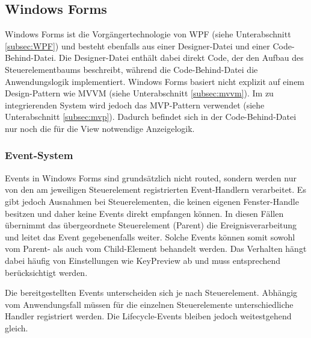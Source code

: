 \subsection{Windows Forms}
\label{subsec:Winforms}
Windows Forms \cite{microsoft_winforms_overview} ist die Vorgängertechnologie von WPF (siehe Unterabschnitt \ref{subsec:WPF}) und besteht ebenfalls aus einer Designer-Datei und einer Code-Behind-Datei. Die Designer-Datei enthält dabei direkt Code, der den Aufbau des Steuerelementbaums beschreibt, während die Code-Behind-Datei die Anwendungslogik implementiert. Windows Forms basiert nicht explizit auf einem Design-Pattern wie MVVM (siehe Unterabschnitt \ref{subsec:mvvm}). Im zu integrierenden System wird jedoch das MVP-Pattern verwendet (siehe Unterabschnitt \ref{subsec:mvp}). Dadurch befindet sich in der Code-Behind-Datei nur noch die für die View notwendige Anzeigelogik.

\subsubsection{Event-System}
Events in Windows Forms \cite{microsoft_winforms_events_overview} sind grundsätzlich nicht routed, sondern werden nur von den am jeweiligen Steuerelement registrierten Event-Handlern verarbeitet. Es gibt jedoch Ausnahmen bei Steuerelementen, die keinen eigenen Fenster-Handle besitzen und daher keine Events direkt empfangen können. In diesen Fällen übernimmt das übergeordnete Steuerelement (Parent) die Ereignisverarbeitung und leitet das Event gegebenenfalls weiter. Solche Events können somit sowohl vom Parent- als auch vom Child-Element behandelt werden. Das Verhalten hängt dabei häufig von Einstellungen wie KeyPreview \cite{microsoft_form_keypreview} ab und muss entsprechend berücksichtigt werden.

Die bereitgestellten Events unterscheiden sich je nach Steuerelement. Abhängig vom Anwendungsfall müssen für die einzelnen Steuerelemente unterschiedliche Handler registriert werden. Die Lifecycle-Events bleiben jedoch weitestgehend gleich.





